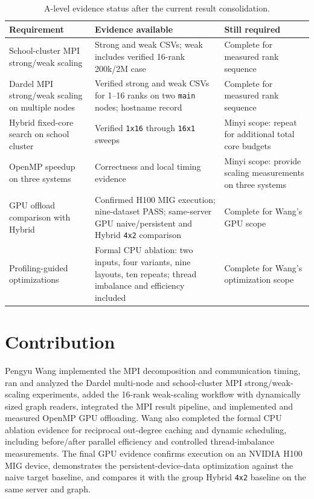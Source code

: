 \documentclass[11pt]{article}
\begin{document}
\begin{table}[H]
\centering
\caption{A-level evidence status after the current result consolidation.}
\label{tab:wang-remaining}
\small
\begin{tabular}{p{}p{}p{}}
\toprule
Requirement & Evidence available & Still required \\
\midrule
School-cluster MPI strong/weak scaling &
Strong and weak CSVs; weak includes verified 16-rank 200k/2M case &
Complete for measured rank sequence \\
Dardel MPI strong/weak scaling on multiple nodes &
Verified strong and weak CSVs for 1--16 ranks on two \texttt{main} nodes; hostname record &
Complete for measured rank sequence \\
Hybrid fixed-core search on school cluster &
Verified \texttt{1x16} through \texttt{16x1} sweeps &
Minyi scope: repeat for additional total core budgets \\
OpenMP speedup on three systems &
Correctness and local timing evidence &
Minyi scope: provide scaling measurements on three systems \\
GPU offload comparison with Hybrid &
Confirmed H100 MIG execution; nine-dataset PASS; same-server GPU naive/persistent and Hybrid \texttt{4x2} comparison &
Complete for Wang's GPU scope \\
Profiling-guided optimizations &
Formal CPU ablation: two inputs, four variants, nine layouts, ten repeats; thread imbalance and efficiency included &
Complete for Wang's optimization scope \\
\bottomrule
\end{tabular}
\end{table}

\section*{Contribution}
\label{sec:wang-contribution}

Pengyu Wang implemented the MPI decomposition and communication timing, ran and
analyzed the Dardel multi-node and school-cluster MPI strong/weak-scaling
experiments, added the 16-rank weak-scaling workflow with dynamically sized
graph readers, integrated the MPI result pipeline, and implemented and measured
OpenMP GPU offloading. Wang also completed the formal CPU ablation evidence for
reciprocal out-degree caching and dynamic scheduling, including before/after
parallel efficiency and controlled thread-imbalance measurements. The final
GPU evidence confirms execution on an NVIDIA H100 MIG device, demonstrates the
persistent-device-data optimization against the naive target baseline, and
compares it with the group Hybrid \texttt{4x2} baseline on the same server and
graph.
\end{document}
